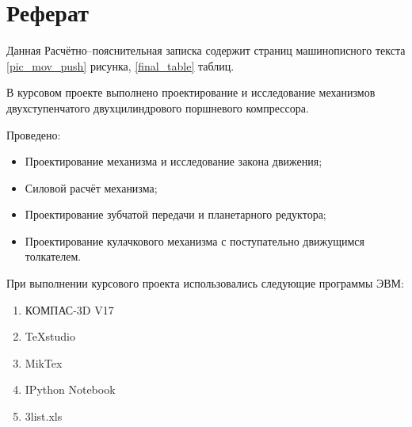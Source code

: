 \section*{Реферат}
Данная Расчётно--пояснительная записка содержит \pageref{final_page} 
страниц машинописного текста \ref{pic_mov_push} 
рисунка, \ref{final_table} 
таблиц. 

В курсовом проекте выполнено проектирование и исследование механизмов двухступенчатого двухцилиндрового поршневого компрессора.

Проведено:
\begin{itemize}
	\item Проектирование механизма и исследование закона движения;
	\item Силовой расчёт механизма;
	\item Проектирование зубчатой передачи и планетарного редуктора;
	\item Проектирование кулачкового механизма с поступательно движущимся толкателем.
\end{itemize} 

При выполнении курсового проекта использовались следующие программы ЭВМ:

\begin{enumerate}
	\item КОМПАС-3D V17
	\item TeXstudio
	\item MikTex
	\item IPython Notebook
	\item 3list.xls
\end{enumerate}